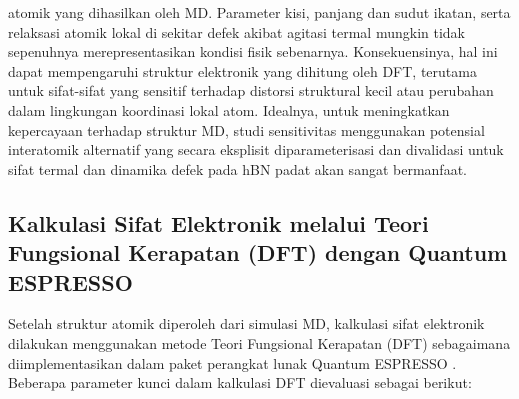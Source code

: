 atomik yang dihasilkan oleh MD. Parameter kisi, panjang dan sudut ikatan, serta relaksasi atomik lokal di sekitar defek akibat agitasi termal mungkin tidak sepenuhnya merepresentasikan kondisi fisik sebenarnya. Konsekuensinya, hal ini dapat mempengaruhi struktur elektronik yang dihitung oleh DFT, terutama untuk sifat-sifat yang sensitif terhadap distorsi struktural kecil atau perubahan dalam lingkungan koordinasi lokal atom. Idealnya, untuk meningkatkan kepercayaan terhadap struktur MD, studi sensitivitas menggunakan potensial interatomik alternatif yang secara eksplisit diparameterisasi dan divalidasi untuk sifat termal dan dinamika defek pada hBN padat akan sangat bermanfaat. \subsection{Kalkulasi Sifat Elektronik melalui Teori Fungsional Kerapatan (DFT) dengan Quantum ESPRESSO}
\label{subsec:dft_qe}
Setelah struktur atomik diperoleh dari simulasi MD, kalkulasi sifat elektronik dilakukan menggunakan metode Teori Fungsional Kerapatan (DFT) \citep{Hohenberg1964, Kohn1965} sebagaimana diimplementasikan dalam paket perangkat lunak Quantum ESPRESSO \citep{Giannozzi2009, Giannozzi2017}. Beberapa parameter kunci dalam kalkulasi DFT dievaluasi sebagai berikut:


